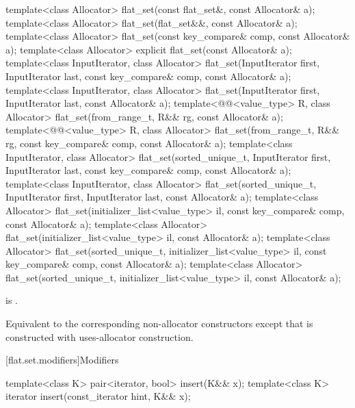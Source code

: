 %
\begin{itemdecl}
template<class Allocator>
  flat_set(const flat_set&, const Allocator& a);
template<class Allocator>
  flat_set(flat_set&&, const Allocator& a);
template<class Allocator>
  flat_set(const key_compare& comp, const Allocator& a);
template<class Allocator>
  explicit flat_set(const Allocator& a);
template<class InputIterator, class Allocator>
  flat_set(InputIterator first, InputIterator last, const key_compare& comp, const Allocator& a);
template<class InputIterator, class Allocator>
  flat_set(InputIterator first, InputIterator last, const Allocator& a);
template<@@<value_type> R, class Allocator>
  flat_set(from_range_t, R&& rg, const Allocator& a);
template<@@<value_type> R, class Allocator>
  flat_set(from_range_t, R&& rg, const key_compare& comp, const Allocator& a);
template<class InputIterator, class Allocator>
  flat_set(sorted_unique_t, InputIterator first, InputIterator last,
           const key_compare& comp, const Allocator& a);
template<class InputIterator, class Allocator>
  flat_set(sorted_unique_t, InputIterator first, InputIterator last, const Allocator& a);
template<class Allocator>
  flat_set(initializer_list<value_type> il, const key_compare& comp, const Allocator& a);
template<class Allocator>
  flat_set(initializer_list<value_type> il, const Allocator& a);
template<class Allocator>
  flat_set(sorted_unique_t, initializer_list<value_type> il,
           const key_compare& comp, const Allocator& a);
template<class Allocator>
  flat_set(sorted_unique_t, initializer_list<value_type> il, const Allocator& a);
\end{itemdecl}

\begin{itemdescr}
\pnum
\constraints
{} is .

\pnum
\effects
Equivalent to the corresponding non-allocator constructors
except that  is constructed with
uses-allocator construction.
\end{itemdescr}

[flat.set.modifiers]{Modifiers}

%
\begin{itemdecl}
template<class K> pair<iterator, bool> insert(K&& x);
template<class K> iterator insert(const_iterator hint, K&& x);
\end{itemdecl}

